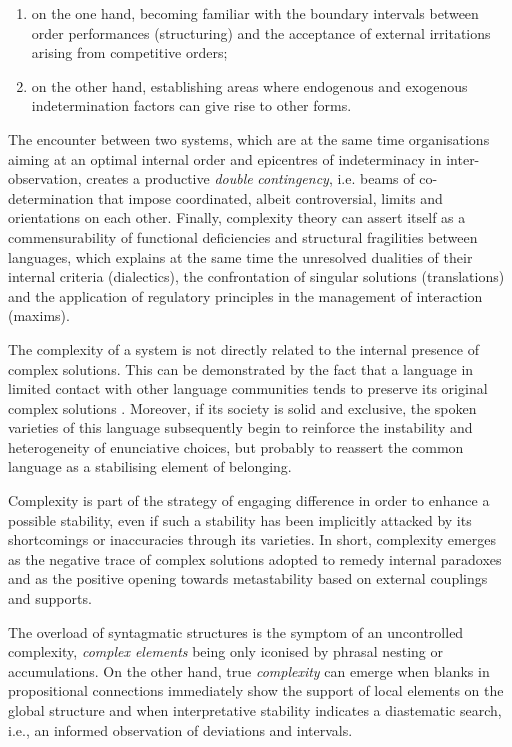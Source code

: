 \documentclass[output=paper]{langscibook}
\begin{document}
\begin{enumerate}
\item on the one hand, becoming familiar with the boundary intervals between order performances (structuring) and the acceptance of external irritations arising from competitive orders; 
\item on the other hand, establishing areas where endogenous and exogenous indetermination factors can give rise to other forms. 
\end{enumerate}

The encounter between two systems, which are at the same time organisations aiming at an optimal internal order and epicentres of indeterminacy in inter-observation, creates a productive \textit{double} \textit{contingency}, i.e. beams of co-de\-ter\-mi\-na\-tion that impose coordinated, albeit controversial, limits and orientations on each other. Finally, complexity theory can assert itself as a commensurability of functional deficiencies and structural fragilities between languages, which explains at the same time the unresolved dualities of their internal criteria (dialectics), the confrontation of singular solutions (translations) and the application of regulatory principles in the management of interaction (maxims). 

The complexity of a system is not directly related to the internal presence of complex solutions. This can be demonstrated by the fact that a language in limited contact with other language communities tends to preserve its original complex solutions \citep[9]{HadermannEtAl2017}. Moreover, if its society is solid and exclusive, the spoken varieties of this language subsequently begin to reinforce the instability and heterogeneity of enunciative choices, but probably to reassert the common language as a stabilising element of belonging. 

Complexity is part of the strategy of engaging difference in order to enhance a possible stability, even if such a stability has been implicitly attacked by its shortcomings or inaccuracies through its varieties. In short, complexity emerges as the negative trace of complex solutions adopted to remedy internal paradoxes and as the positive opening towards metastability based on external couplings and supports. 

The overload of syntagmatic structures is the symptom of an uncontrolled complexity, \textit{complex elements} being only iconised by phrasal nesting or accumulations. On the other hand, true \textit{complexity} can emerge when blanks in propositional connections immediately show the support of local elements on the global structure and when interpretative stability indicates a diastematic search, i.e., an informed observation of deviations and intervals. 
\end{document}
